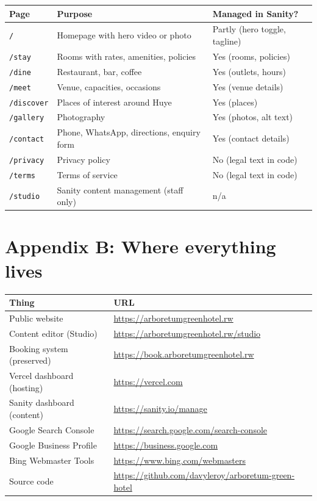 \documentclass[11pt,a4paper]{article}
\begin{document}
\begin{tabularx}{\textwidth}{@{} l X l @{}}
\toprule
\textbf{Page} & \textbf{Purpose} & \textbf{Managed in Sanity?} \\
\midrule
\texttt{/} & Homepage with hero video or photo & Partly (hero toggle, tagline) \\
\texttt{/stay} & Rooms with rates, amenities, policies & Yes (rooms, policies) \\
\texttt{/dine} & Restaurant, bar, coffee & Yes (outlets, hours) \\
\texttt{/meet} & Venue, capacities, occasions & Yes (venue details) \\
\texttt{/discover} & Places of interest around Huye & Yes (places) \\
\texttt{/gallery} & Photography & Yes (photos, alt text) \\
\texttt{/contact} & Phone, WhatsApp, directions, enquiry form & Yes (contact details) \\
\texttt{/privacy} & Privacy policy & No (legal text in code) \\
\texttt{/terms} & Terms of service & No (legal text in code) \\
\texttt{/studio} & Sanity content management (staff only) & n/a \\
\bottomrule
\end{tabularx}

\section*{Appendix B: Where everything lives}

\begin{tabularx}{\textwidth}{@{} X X @{}}
\toprule
\textbf{Thing} & \textbf{URL} \\
\midrule
Public website & \url{https://arboretumgreenhotel.rw} \\
Content editor (Studio) & \url{https://arboretumgreenhotel.rw/studio} \\
Booking system (preserved) & \url{https://book.arboretumgreenhotel.rw} \\
Vercel dashboard (hosting) & \url{https://vercel.com} \\
Sanity dashboard (content) & \url{https://sanity.io/manage} \\
Google Search Console & \url{https://search.google.com/search-console} \\
Google Business Profile & \url{https://business.google.com} \\
Bing Webmaster Tools & \url{https://www.bing.com/webmasters} \\
Source code & \url{https://github.com/davyleroy/arboretum-green-hotel} \\
\bottomrule
\end{tabularx}
\end{document}

